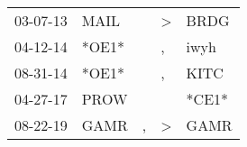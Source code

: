 \begin{supertabular}{p{0.07\textwidth}p{0.06\textwidth}p{0.02\textwidth}p{0.02\textwidth}p{0.06\textwidth}}
 03-07-13\textsuperscript{} &  MAIL\textsuperscript{} &                  &  \textgreater &           BRDG\textsuperscript{} \\
 04-12-14\textsuperscript{} &                   *OE1* &                  &             , &           iwyh\textsuperscript{} \\
 08-31-14\textsuperscript{} &                   *OE1* &                  &             , &           KITC\textsuperscript{} \\
 04-27-17\textsuperscript{} &  PROW\textsuperscript{} &                  &               &                            *CE1* \\
 08-22-19\textsuperscript{} &  GAMR\textsuperscript{} &                , &  \textgreater &           GAMR\textsuperscript{} \\
\end{supertabular}
